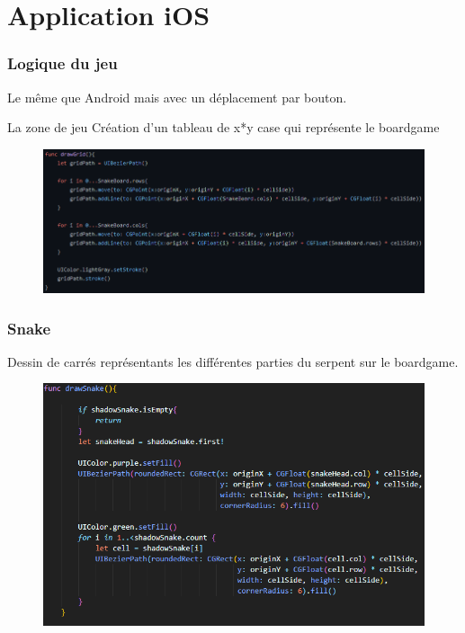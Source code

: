 \documentclass{beamer}
\begin{document}
\section{Application iOS}

%
%
\begin{frame}
  \frametitle{Logique du jeu}
	Le même que Android mais avec un déplacement par bouton.
\end{frame}
%
%
\begin{frame}{La zone de jeu}
Création d'un tableau de x*y case qui représente le boardgame
\begin{figure}
        \centering
        \includegraphics[scale=0.5]{DrawGrid.png}
    \end{figure}
\end{frame}
  
\begin{frame}
  \frametitle{Snake}
 Dessin de carrés représentants les différentes parties du serpent sur le boardgame.
 \begin{figure}
        \centering
        \includegraphics[scale=0.5]{DrawSnake.png}
    \end{figure}
  
\end{frame}
\end{document}
